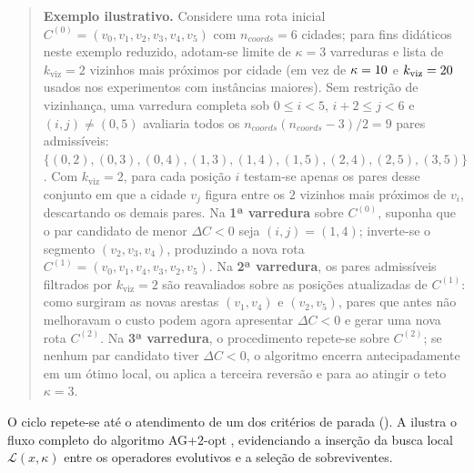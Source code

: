 \begin{quote}
      \textbf{Exemplo ilustrativo.} Considere uma rota inicial \(C^{(0)} = (v_0, v_1, v_2, v_3, v_4, v_5)\) com \(n_{coords} = 6\) cidades; para fins didáticos neste exemplo reduzido, adotam-se limite de \(\kappa = 3\) varreduras e lista de \(k_{\text{viz}} = 2\) vizinhos mais próximos por cidade (em vez de \(\kappa = 10\) e \(k_{\text{viz}} = 20\) usados nos experimentos com instâncias maiores).
      Sem restrição de vizinhança, uma varredura completa sob \(0 \le i < 5\), \(i+2 \le j < 6\) e \((i,j) \neq (0,5)\) avaliaria todos os \(n_{coords}(n_{coords}-3)/2 = 9\) pares admissíveis: \(\{(0,2), (0,3), (0,4), (1,3), (1,4), (1,5), (2,4), (2,5), (3,5)\}\).
      Com \(k_{\text{viz}} = 2\), para cada posição \(i\) testam-se apenas os pares desse conjunto em que a cidade \(v_j\) figura entre os \(2\) vizinhos mais próximos de \(v_i\), descartando os demais pares.
      Na \textbf{1ª varredura} sobre \(C^{(0)}\), suponha que o par candidato de menor \(\Delta C < 0\) seja \((i,j) = (1,4)\); inverte-se o segmento \((v_2, v_3, v_4)\), produzindo a nova rota \(C^{(1)} = (v_0, v_1, v_4, v_3, v_2, v_5)\).
      Na \textbf{2ª varredura}, os pares admissíveis filtrados por \(k_{\text{viz}} = 2\) são reavaliados sobre as posições atualizadas de \(C^{(1)}\): como surgiram as novas arestas \((v_1, v_4)\) e \((v_2, v_5)\), pares que antes não melhoravam o custo podem agora apresentar \(\Delta C < 0\) e gerar uma nova rota \(C^{(2)}\).
      Na \textbf{3ª varredura}, o procedimento repete-se sobre \(C^{(2)}\); se nenhum par candidato tiver \(\Delta C < 0\), o algoritmo encerra antecipadamente em um ótimo local, ou aplica a terceira reversão e para ao atingir o teto \(\kappa = 3\).
\end{quote}

O ciclo repete-se até o atendimento de um dos critérios de parada ().
A  ilustra o fluxo completo do algoritmo AG+\(2\)-opt \autocite{larranaga1999genetic}, evidenciando a inserção da busca local \(\mathcal{L}(x, \kappa)\) entre os operadores evolutivos e a seleção de sobreviventes.

